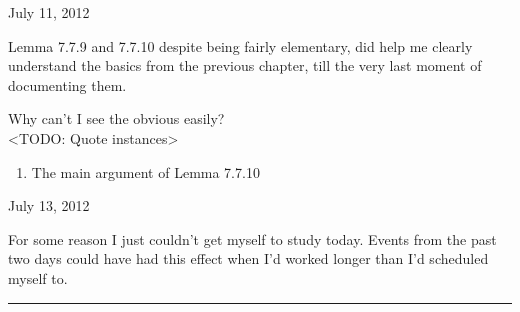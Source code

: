 \documentclass[12pt]{article}
\begin{document}
\begin{flushright} {\small July 11, 2012} \end{flushright}
Lemma 7.7.9 and 7.7.10 despite being fairly elementary, did help me clearly understand the basics from the previous chapter, till the very last moment of documenting them.
\par
Why can't I see the obvious easily?\\
<TODO: Quote instances>
\begin{enumerate}
\item The main argument of Lemma 7.7.10
\end{enumerate}
\begin{flushright} {\small July 13, 2012} \end{flushright}
For some reason I just couldn't get myself to study today. Events from the past two days could have had this effect when I'd worked longer than I'd scheduled myself to.
\vspace{12pt}
\hrule
\end{document}
